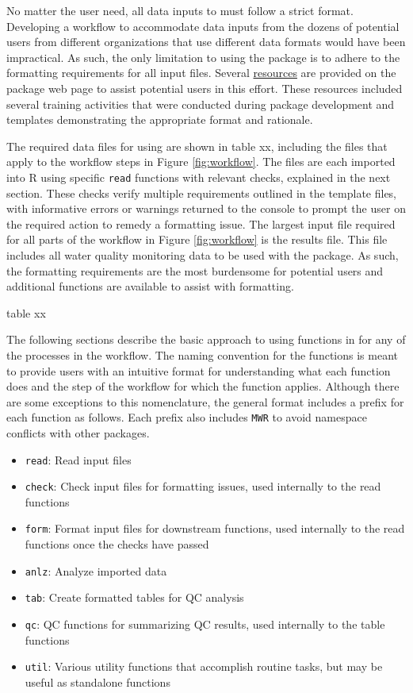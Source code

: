 No matter the user need, all data inputs to  must follow a strict format. Developing a workflow to accommodate data inputs from the dozens of potential users from different organizations that use different data formats would have been impractical. As such, the only limitation to using the package is to adhere to the formatting requirements for all input files. Several \href{https://massbays-tech.github.io/MassWateR/RESOURCES.html}{resources} are provided on the package web page to assist potential users in this effort. These resources included several training activities that were conducted during package development and templates demonstrating the appropriate format and rationale.

The required data files for using  are shown in table xx, including the files that apply to the workflow steps in Figure \ref{fig:workflow}. The files are each imported into R using specific \texttt{read} functions with relevant checks, explained in the next section. These checks verify multiple requirements outlined in the template files, with informative errors or warnings returned to the console to prompt the user on the required action to remedy a formatting issue. The largest input file required for all parts of the workflow in Figure \ref{fig:workflow} is the results file. This file includes all water quality monitoring data to be used with the package. As such, the formatting requirements are the most burdensome for potential users and additional functions are available to assist with formatting.

table xx

The following sections describe the basic approach to using functions in  for any of the processes in the workflow. The naming convention for the functions is meant to provide users with an intuitive format for understanding what each function does and the step of the workflow for which the function applies. Although there are some exceptions to this nomenclature, the general format includes a prefix for each function as follows. Each prefix also includes \texttt{MWR} to avoid namespace conflicts with other packages.

\begin{itemize}
\tightlist
\item
  \texttt{read}: Read input files
\item
  \texttt{check}: Check input files for formatting issues, used internally to the read functions
\item
  \texttt{form}: Format input files for downstream functions, used internally to the read functions once the checks have passed
\item
  \texttt{anlz}: Analyze imported data
\item
  \texttt{tab}: Create formatted tables for QC analysis
\item
  \texttt{qc}: QC functions for summarizing QC results, used internally to the table functions
\item
  \texttt{util}: Various utility functions that accomplish routine tasks, but may be useful as standalone functions
\end{itemize}

